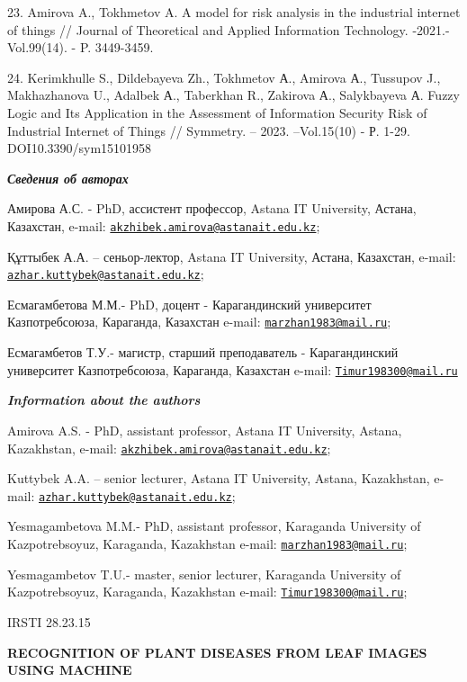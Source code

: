 \documentclass[
]{article}
\begin{document}
23. Amirova A., Tokhmetov A. A model for risk analysis in the industrial
internet of things // Journal of Theoretical and Applied Information
Technology. -2021.- Vol.99(14). - P. 3449-3459.

24. Kerimkhulle S., Dildebayeva Zh., Tokhmetov А., Amirova А., Tussupov
J., Makhazhanova U., Adalbek А., Taberkhan R., Zakirova А., Salykbayeva
А. Fuzzy Logic and Its Application in the Assessment of Information
Security Risk of Industrial Internet of Things // Symmetry. -- 2023.
--Vol.15(10) - Р. 1-29. DOI10.3390/sym15101958

\emph{\textbf{Сведения об авторах}}

Амирова А.С. - PhD, ассистент профессор, Astana IT University, Астана,
Казахстан, e-mail:
\href{mailto:akzhibek.amirova@astanait.edu.kz}{\nolinkurl{akzhibek.amirova@astanait.edu.kz}};

Құттыбек А.А. -- сеньор-лектор, Astana IT University, Астана, Казахстан,
e-mail:
\href{mailto:azhar.kuttybek@astanait.edu.kz}{\nolinkurl{azhar.kuttybek@astanait.edu.kz}};

Есмагамбетова М.М.- PhD, доцент - Карагандинский университет
Казпотребсоюза, Караганда, Казахстан e-mail:
\href{mailto:marzhan1983@mail.ru}{\nolinkurl{marzhan1983@mail.ru}};

Есмагамбетов Т.У.- магистр, старший преподаватель - Карагандинский
университет Казпотребсоюза, Караганда, Казахстан e-mail:
\href{mailto:Timur198300@mail.ru}{\nolinkurl{Timur198300@mail.ru}}

\emph{\textbf{Information about the authors}}

Amirova A.S. - PhD, assistant professor, Astana IT University, Astana,
Kazakhstan, e-mail:
\href{mailto:akzhibek.amirova@astanait.edu.kz}{\nolinkurl{akzhibek.amirova@astanait.edu.kz}};

Kuttybek A.A. -- senior lecturer, Astana IT University, Astana,
Kazakhstan, e-mail:
\href{mailto:azhar.kuttybek@astanait.edu.kz}{\nolinkurl{azhar.kuttybek@astanait.edu.kz}};

Yesmagambetova M.M.- PhD, assistant professor, Karaganda University of
Kazpotrebsoyuz, Karaganda, Kazakhstan e-mail:
\href{mailto:marzhan1983@mail.ru}{\nolinkurl{marzhan1983@mail.ru}};

Yesmagambetov T.U.- master, senior lecturer, Karaganda University of
Kazpotrebsoyuz, Karaganda, Kazakhstan e-mail:
\href{mailto:Timur198300@mail.ru}{\nolinkurl{Timur198300@mail.ru}};

IRSTI 28.23.15

\textbf{RECOGNITION OF PLANT DISEASES FROM LEAF IMAGES USING MACHINE}
\end{document}
